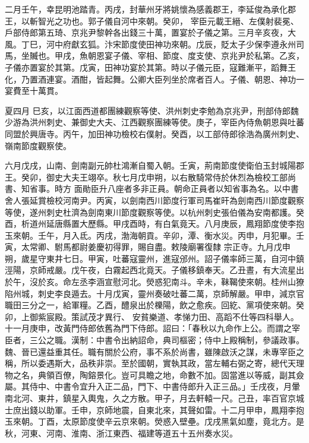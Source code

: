 \begin{pinyinscope}
 二月壬午，幸昆明池踏青。丙戌，封華州牙將姚懷為感義郡王，李延俊為承化郡王，以斬智光之功也。郭子儀自河中來朝。癸卯，
 宰臣元載王縉、左僕射裴冕、戶部侍郎第五琦、京兆尹黎幹各出錢三十萬，置宴於子儀之第。三月辛亥夜，大風。丁巳，河中府獻玄狐。汴宋節度使田神功來朝。戊辰，貶太子少保李遵永州司馬，坐贓也。甲戌，魚朝恩宴子儀、宰相、節度、度支使、京兆尹於私第。乙亥，子儀亦置宴於其第。戊寅，田神功宴於其第。時以子儀元臣，寇難漸平，蹈舞王化，乃置酒連宴。酒酣，皆起舞。公卿大臣列坐於席者百人。子儀、朝恩、神功一宴費至十萬貫。



 夏四月
 巳亥，以江面西道都團練觀察等使、洪州刺史李勉為京兆尹，刑部侍郎魏少游為洪州刺史、兼御史大夫、江西觀察團練等使。庚子，宰臣內侍魚朝恩與吐蕃同盟於興唐寺。丙午，加田神功檢校右僕射。癸酉，以工部侍郎徐浩為廣州刺史、嶺南節度觀察使。



 六月戊戌，山南、劍南副元帥杜鴻漸自蜀入朝。壬寅，荊南節度使衛伯玉封城陽郡王。癸卯，御史大夫王翊卒。秋七月戊申朔，以右散騎常侍於休烈為檢校工部尚書、知省事。時方
 面勛臣升八座者多非正員。朝命正員者以知省事為名。以中書舍人張延賞檢校河南尹。丙寅，以劍南西川節度行軍司馬崔旰為劍南西川節度觀察等使，遂州刺史杜濟為劍南東川節度觀察等使。以杭州刺史張伯儀為安南都護。癸酉，析道州延唐縣置大歷縣。甲戌酉時，有白氣竟天。八月庚辰，鳳翔節度使李抱玉來朝。壬午，月入氐。丙戌，渤海朝貢。辛卯，潭、衡水災。丙申，月犯畢。壬寅，太常卿、駙馬都尉姜慶初得罪，賜自盡。敕陵廟署復隸
 宗正寺。九月戊申朔，歲星守東井七日。甲寅，吐蕃寇靈州，進寇邠州。詔子儀率師三萬，自河中鎮涇陽，京師戒嚴。戊午夜，白霧起西北竟天。子儀移鎮奉天。乙丑晝，有大流星出於午，沒於亥。命左丞李涵宣慰河北。熒惑犯南斗。辛未，靺鞨使來朝。桂州山獠陷州城，刺史李良遁去。十月戊寅，靈州奏破吐蕃二萬，京師解嚴。甲申，減京官職田三分之一，給軍糧。乙酉，醴泉出於櫟陽，飲之愈疾。回紇、黨項使來朝。癸卯，上御紫宸殿。策試茂才異行、
 安貧樂道、孝悌力田、高蹈不仕等四科舉人。十一月庚申，改黃門侍郎依舊為門下侍郎。詔曰：「春秋以九命作上公。而謂之宰臣者，三公之職。漢制：中書令出納詔命，典司樞密；侍中上殿稱制，參議政事。魏、晉已還益重其任。職有關於公府，事不系於尚書，雖陳啟沃之謀，未專宰臣之稱，所以委遇斯大，品秩非崇。至於國朝，實執其政，當左輔右弼之寄，總代天理物之名，典領百僚，陶鎔景化。豈可具瞻之地，命數不加。固當進以等威，副其僉
 屬。其侍中、中書令宜升入正二品，門下、中書侍郎升入正三品。」壬戌夜，月暈南北河、東井，鎮星入輿鬼，久之方散。甲子，月去軒轅一尺。己丑，率百官京城士庶出錢以助軍。壬申，京師地震，自東北來，其聲如雷。十二月甲申，鳳翔李抱玉來朝。丁酉，太原節度使辛云京來朝。熒惑入壁壘。戊戌黑氣如塵，竟北方。是秋，河東、河南、淮南、浙江東西、福建等道五十五州奏水災。




\end{pinyinscope}
